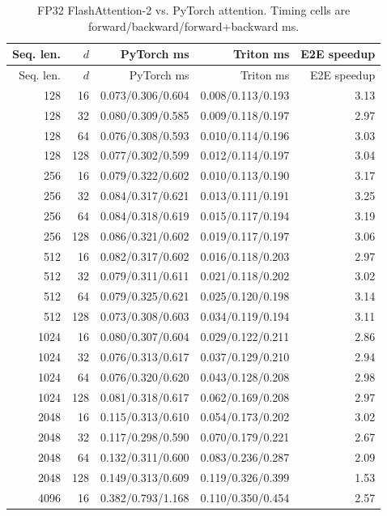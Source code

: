 \documentclass[11pt]{article}
\begin{document}
{\scriptsize
\setlength{\tabcolsep}{3pt}
\begin{longtable}{rrrrr}
  \caption{FP32 FlashAttention-2 vs. PyTorch attention. Timing cells are forward/backward/forward+backward ms.}\\
  \toprule
  Seq. len. & $d$ & PyTorch ms & Triton ms & E2E speedup \\
  \midrule
  \endfirsthead
  \toprule
  Seq. len. & $d$ & PyTorch ms & Triton ms & E2E speedup \\
  \midrule
  \endhead
  128 & 16 & 0.073/0.306/0.604 & 0.008/0.113/0.193 & 3.13 \\
  128 & 32 & 0.080/0.309/0.585 & 0.009/0.118/0.197 & 2.97 \\
  128 & 64 & 0.076/0.308/0.593 & 0.010/0.114/0.196 & 3.03 \\
  128 & 128 & 0.077/0.302/0.599 & 0.012/0.114/0.197 & 3.04 \\
  256 & 16 & 0.079/0.322/0.602 & 0.010/0.113/0.190 & 3.17 \\
  256 & 32 & 0.084/0.317/0.621 & 0.013/0.111/0.191 & 3.25 \\
  256 & 64 & 0.084/0.318/0.619 & 0.015/0.117/0.194 & 3.19 \\
  256 & 128 & 0.086/0.321/0.602 & 0.019/0.117/0.197 & 3.06 \\
  512 & 16 & 0.082/0.317/0.602 & 0.016/0.118/0.203 & 2.97 \\
  512 & 32 & 0.079/0.311/0.611 & 0.021/0.118/0.202 & 3.02 \\
  512 & 64 & 0.079/0.325/0.621 & 0.025/0.120/0.198 & 3.14 \\
  512 & 128 & 0.073/0.308/0.603 & 0.034/0.119/0.194 & 3.11 \\
  1024 & 16 & 0.080/0.307/0.604 & 0.029/0.122/0.211 & 2.86 \\
  1024 & 32 & 0.076/0.313/0.617 & 0.037/0.129/0.210 & 2.94 \\
  1024 & 64 & 0.076/0.320/0.620 & 0.043/0.128/0.208 & 2.98 \\
  1024 & 128 & 0.081/0.318/0.617 & 0.062/0.169/0.208 & 2.97 \\
  2048 & 16 & 0.115/0.313/0.610 & 0.054/0.173/0.202 & 3.02 \\
  2048 & 32 & 0.117/0.298/0.590 & 0.070/0.179/0.221 & 2.67 \\
  2048 & 64 & 0.132/0.311/0.600 & 0.083/0.236/0.287 & 2.09 \\
  2048 & 128 & 0.149/0.313/0.609 & 0.119/0.326/0.399 & 1.53 \\
  4096 & 16 & 0.382/0.793/1.168 & 0.110/0.350/0.454 & 2.57 \\

\end{longtable}}
\end{document}
